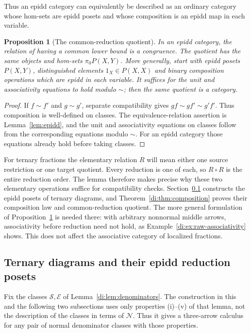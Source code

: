 \documentclass[11pt,reqno,a4paper]{amsart}
\newtheorem{proposition}[theorem]{Proposition}
\theoremstyle{definition}
\theoremstyle{remark}
\newcommand{\N}{\mathcal{N}}
\newcommand{\0}{\mathbf{0}}
\renewcommand{\1}{\mathbf{1}}
\newcommand{\Sden}{\mathcal S}
\newcommand{\Eden}{\mathcal E}
\begin{document}
Thus an epidd category can equivalently be described as an ordinary
category whose hom-sets are epidd posets and whose composition is
an epidd map in each variable.

\begin{proposition}[The common-reduction quotient]\label{prop:epidd-congruence}
In an epidd category, the relation of having a common lower bound is
a congruence. The quotient has the same objects and hom-sets
$\pi_0P(X,Y)$.
More generally, start with epidd posets $P(X,Y)$, distinguished elements
$1_X\in P(X,X)$ and binary composition operations which are epidd in
each variable. It suffices for the unit and associativity equations
to hold \emph{modulo $\sim$}; then the same quotient is a category.
\end{proposition}
\begin{proof}
If $f\sim f'$ and $g\sim g'$, separate compatibility gives
$gf\sim gf'\sim g'f'$. Thus composition is well-defined on classes.
The equivalence-relation assertion is Lemma~\ref{lem:epidd}, and
the unit and associativity equations on classes follow from the
corresponding equations modulo $\sim$. For an epidd category those
equations already hold before taking classes.
\end{proof}

For ternary fractions the elementary relation $R$ will mean either
one source restriction or one target quotient. Every reduction is
one of each, so $R\circ R$ is the entire reduction order. The lemma
therefore makes precise why these two elementary operations suffice
for compatibility checks. Section~\ref{subsec:di-reductions} constructs
the epidd posets of ternary diagrams, and
Theorem~\ref{di:thm:composition} proves their composition law and
common-reduction quotient. The more general formulation of
Proposition~\ref{prop:epidd-congruence} is needed there: with arbitrary
nonnormal middle arrows, associativity before reduction need not hold,
as Example~\ref{di:ex:raw-associativity} shows. This does not affect the
associative category of localized fractions.

\subsection{Ternary diagrams and their epidd reduction posets}\label{subsec:di-reductions}

Fix the classes $\Sden,\Eden$ of Lemma~\ref{di:lem:denominators}.
The construction in this and the following two subsections uses only
properties (i)--(v) of that lemma, not the description of the classes
in terms of $\N$. Thus it gives a three-arrow calculus for any pair
of normal denominator classes with those properties.
\end{document}

